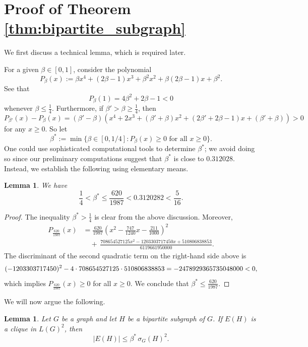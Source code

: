 \documentclass[11pt]{article}
\theoremstyle{plain}
\newtheorem{lemma}[theorem]{Lemma}
\numberwithin{equation}{section}
\begin{document}
\section{Proof of Theorem \ref{thm:bipartite_subgraph}}
\label{section:clique_number_line_square}

We first discuss a technical lemma, which is required later. 

For a given $\beta \in [0,1]$, consider the polynomial
\[  P_\beta(x)
   :=
   \beta x^4+(2\beta-1)x^3+\beta^2x^2+\beta(2\beta-1)x+\beta^2.
\]
See that 
\[ P_{\beta}(1) = 4\beta^2 + 2\beta -1 < 0\]
whenever $\beta \le \frac{1}{4}$. Furthermore, if $\beta' > \beta\ge \frac{1}{4}$, then 
\[ P_{\beta'}(x) - P_{\beta}(x) = \left(\beta' - \beta\right)\left(x^4 + 2x^3 + (\beta' + \beta)x^2 + (2\beta' + 2\beta -1)x + (\beta'+\beta)\right)>0\]
for any $x\ge 0$. So let
\[ \beta^* := \min\{\beta\in [0,1/4]: P_{\beta}(x)\ge 0 \text{ for all }x\ge 0\}.\]
One could use sophisticated computational tools to determine $\beta^*$; we avoid doing so since our preliminary computations suggest that $\beta^*$ is close to $0.312028$. Instead, we establish the following using elementary means.

\begin{lemma}\label{lemma:beta} We have 
    \[ \frac{1}{4} < \beta^* \le \frac{620}{1987} < 0.3120282 < \frac{5}{16}.\]
\end{lemma}
\begin{proof}
The inequality $\beta^* > \frac{1}{4}$ is clear from the above discussion. Moreover, 
\begin{align*}
P_{\frac{620}{1987}}(x)
& =
\frac{620}{1987}
\left(
    x^2-\frac{747}{1240}x-\frac{211}{1000}
\right)^2 \\
& \quad +\, 
\frac{
    708654527125x^2
    -1203303717450x
    +510806838853
}{
    6119661950000
}.
\end{align*}
The discriminant of the second quadratic term on the right-hand side above is  
\[
(-1203303717450)^2
-
4\cdot 708654527125\cdot 510806838853  \\
=
-2478929365735048000
<
0,
\]
which implies $P_{\frac{620}{1987}}(x)\ge 0$ for all $x\ge 0$. We conclude that $\beta^* \le \frac{620}{1987}$. 
\end{proof}

We will now argue the following. 

\begin{lemma}\label{lemma:bipartite_subgraph}
Let $G$ be a graph and let $H$ be a bipartite subgraph of $G$. If
$E(H)$ is a clique in $L(G)^2$, then
\[
   |E(H)|\le \beta^*\,\sigma_G(H)^2.
\]
\end{lemma}
\end{document}
